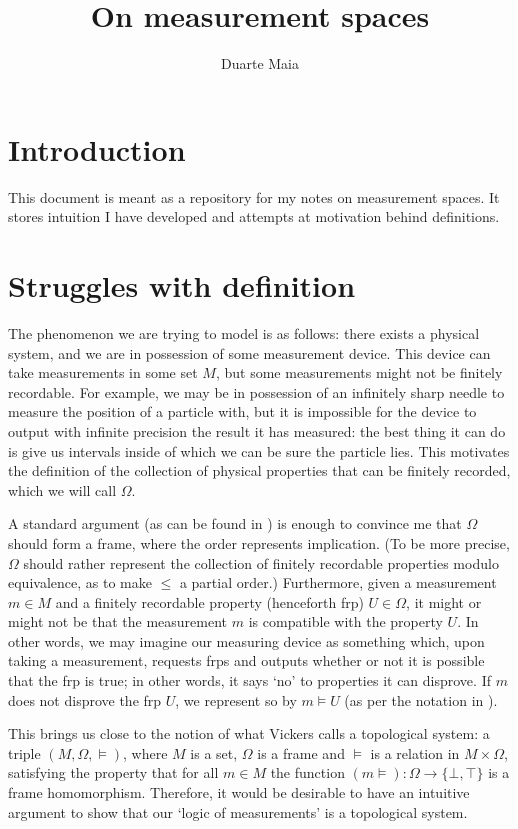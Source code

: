 \documentclass{article}
\title{On measurement spaces}
\author{Duarte Maia}
\theoremstyle{definition}
\begin{document}
\maketitle

\section{Introduction}

This document is meant as a repository for my notes on measurement spaces. It stores intuition I have developed and attempts at motivation behind definitions.

\section{Struggles with definition}

The phenomenon we are trying to model is as follows: there exists a physical system, and we are in possession of some measurement device. This device can take measurements in some set $M$, but some measurements might not be finitely recordable. For example, we may be in possession of an infinitely sharp needle to measure the position of a particle with, but it is impossible for the device to output with infinite precision the result it has measured: the best thing it can do is give us intervals inside of which we can be sure the particle lies. This motivates the definition of the collection of physical properties that can be finitely recorded, which we will call $\Omega$.

A standard argument (as can be found in \cite{topologyvialogic}) is enough to convince me that $\Omega$ should form a frame, where the order represents implication. (To be more precise, $\Omega$ should rather represent the collection of finitely recordable properties modulo equivalence, as to make $\leq$ a partial order.) Furthermore, given a measurement $m \in M$ and a finitely recordable property (henceforth frp) $U \in \Omega$, it might or might not be that the measurement $m$ is compatible with the property $U$. In other words, we may imagine our measuring device as something which, upon taking a measurement, requests frps and outputs whether or not it is possible that the frp is true; in other words, it says `no' to properties it can disprove. If $m$ does not disprove the frp $U$, we represent so by $m \vDash U$ (as per the notation in \cite{topologyvialogic}).

This brings us close to the notion of what Vickers calls a topological system: a triple $(M, \Omega, \vDash)$, where $M$ is a set, $\Omega$ is a frame and $\vDash$ is a relation in $M \times \Omega$, satisfying the property that for all $m \in M$ the function $(m\vDash) \colon \Omega \to \{\bot, \top\}$ is a frame homomorphism. Therefore, it would be desirable to have an intuitive argument to show that our `logic of measurements' is a topological system.
\end{document}
